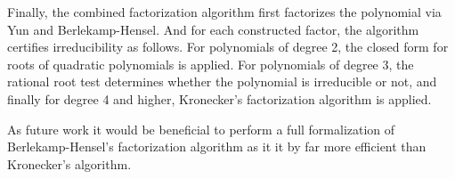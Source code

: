 \documentclass[11pt,a4paper]{article}
\begin{document}
Finally, the combined factorization algorithm first factorizes the polynomial
via Yun and Berlekamp-Hensel. And for each constructed factor, the algorithm 
certifies irreducibility as
follows. For polynomials of degree 2, the 
closed form for roots of quadratic polynomials is applied. For polynomials of degree 3, 
the rational root test determines whether the polynomial is irreducible or not, and finally
for degree 4 and higher, Kronecker's factorization algorithm is applied.

As future work it would be beneficial to perform a full formalization of 
Berlekamp-Hensel's factorization algorithm as it it by far more efficient than Kronecker's algorithm.






\end{document}
